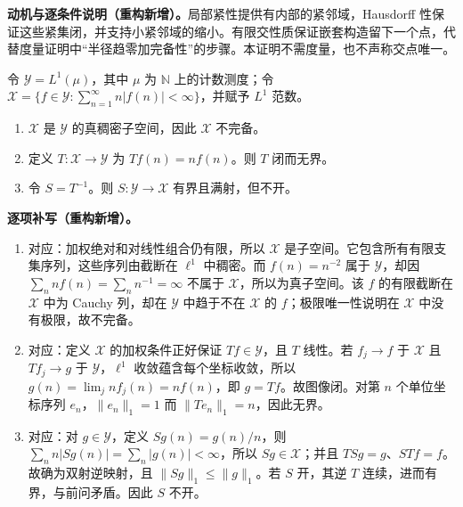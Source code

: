 \documentclass[../../main.tex]{subfiles}
\begin{document}
\begin{remark}
\textbf{动机与逐条件说明（重构新增）。}局部紧性提供有内部的紧邻域，Hausdorff 性保证这些紧集闭，并支持小紧邻域的缩小。有限交性质保证嵌套构造留下一个点，代替度量证明中“半径趋零加完备性”的步骤。本证明不需度量，也不声称交点唯一。
\end{remark}
\begin{exercise}\label{exercise:ch05-weighted-incomplete}
\begin{definition*}[本题的序列空间]\label{definition:ch05-weighted-sequence-domain}
令 $\mathcal Y=L^1(\mu)$，其中 $\mu$ 为 $\mathbb N$ 上的计数测度；令 $\mathcal X=\{f\in\mathcal Y:\sum_{n=1}^{\infty}n|f(n)|<\infty\}$，并赋予 $L^1$ 范数。
\end{definition*}
\begin{enumerate}
\item\label{item:ch05-weighted-dense} $\mathcal X$ 是 $\mathcal Y$ 的真稠密子空间，因此 $\mathcal X$ 不完备。
\item\label{item:ch05-weighted-closed-unbounded} 定义 $T:\mathcal X\to\mathcal Y$ 为 $Tf(n)=nf(n)$。则 $T$ 闭而无界。
\item\label{item:ch05-weighted-inverse-not-open} 令 $S=T^{-1}$。则 $S:\mathcal Y\to\mathcal X$ 有界且满射，但不开。
\end{enumerate}
\end{exercise}
\begin{solution}
\textbf{逐项补写（重构新增）。}
\begin{enumerate}
\item 对应：加权绝对和对线性组合仍有限，所以 $\mathcal X$ 是子空间。它包含所有有限支集序列，这些序列由截断在 $\ell^1$ 中稠密。而 $f(n)=n^{-2}$ 属于 $\mathcal Y$，却因 $\sum_nnf(n)=\sum_nn^{-1}=\infty$ 不属于 $\mathcal X$，所以为真子空间。该 $f$ 的有限截断在 $\mathcal X$ 中为 Cauchy 列，却在 $\mathcal Y$ 中趋于不在 $\mathcal X$ 的 $f$；极限唯一性说明在 $\mathcal X$ 中没有极限，故不完备。
\item 对应：定义 $\mathcal X$ 的加权条件正好保证 $Tf\in\mathcal Y$，且 $T$ 线性。若 $f_j\to f$ 于 $\mathcal X$ 且 $Tf_j\to g$ 于 $\mathcal Y$，$\ell^1$ 收敛蕴含每个坐标收敛，所以 $g(n)=\lim_jnf_j(n)=nf(n)$，即 $g=Tf$。故图像闭。对第 $n$ 个单位坐标序列 $e_n$，$\|e_n\|_1=1$ 而 $\|Te_n\|_1=n$，因此无界。
\item 对应：对 $g\in\mathcal Y$，定义 $Sg(n)=g(n)/n$，则 $\sum_nn|Sg(n)|=\sum_n|g(n)|<\infty$，所以 $Sg\in\mathcal X$；并且 $TSg=g$、$STf=f$。故确为双射逆映射，且 $\|Sg\|_1\le\|g\|_1$。若 $S$ 开，其逆 $T$ 连续，进而有界，与前问矛盾。因此 $S$ 不开。
\end{enumerate}
\end{solution}
\end{document}
